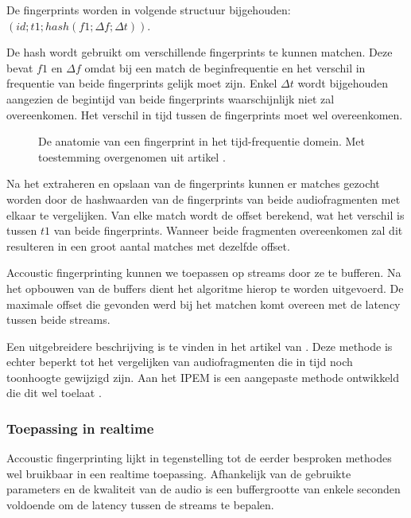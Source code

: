 De fingerprints worden in volgende structuur bijgehouden: $ ( id; t1; hash(f1; \Delta f; \Delta t) ) $.

De hash wordt gebruikt om verschillende fingerprints te kunnen matchen. Deze bevat $ f1 $ en $ \Delta f $ omdat bij een match de beginfrequentie en het verschil in frequentie van beide fingerprints gelijk moet zijn. Enkel $ \Delta t $ wordt bijgehouden aangezien de begintijd van beide fingerprints waarschijnlijk niet zal overeenkomen. Het verschil in tijd tussen de fingerprints moet wel overeenkomen.

\begin{figure}[h]
	\captionsetup{width=0.7\textwidth}
	\caption[De anatomie van een fingerprint]{De anatomie van een fingerprint in het tijd-frequentie domein. Met toestemming overgenomen uit artikel \cite{six2015multimodal}.}
	\begin{center}
		\advance\parskip0.3cm
		
	\end{center}
\end{figure}

Na het extraheren en opslaan van de fingerprints kunnen er matches gezocht worden door de hashwaarden van de fingerprints van beide audiofragmenten met elkaar te vergelijken. Van elke match wordt de offset berekend, wat het verschil is tussen $ t1 $ van beide fingerprints. Wanneer beide fragmenten overeenkomen zal dit resulteren in een groot aantal matches met dezelfde offset. 

Accoustic fingerprinting kunnen we toepassen op streams door ze te bufferen. Na het opbouwen van de buffers dient het algoritme hierop te worden uitgevoerd. De maximale offset die gevonden werd bij het matchen komt overeen met de latency tussen beide streams.

Een uitgebreidere beschrijving is te vinden in het artikel van . Deze methode is echter beperkt tot het vergelijken van audiofragmenten die in tijd noch toonhoogte gewijzigd zijn. Aan het IPEM is een aangepaste methode ontwikkeld die dit wel toelaat \cite{six2014panako}.

\subsubsection{Toepassing in realtime}

Accoustic fingerprinting lijkt in tegenstelling tot de eerder besproken methodes wel bruikbaar in een realtime toepassing. Afhankelijk van de gebruikte parameters en de kwaliteit van de audio is een buffergrootte van enkele seconden voldoende om de latency tussen de streams te bepalen.

